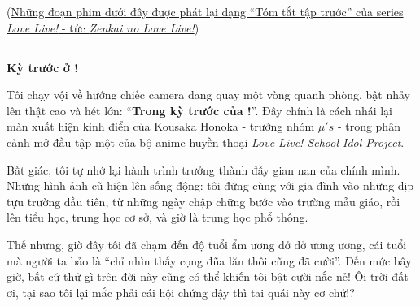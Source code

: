 \documentclass[../main.tex]{subfiles}
\begin{document}

\begin{center}
  (\uline{Những đoạn phim dưới đây được phát lại dạng ``Tóm tắt tập trước'' của series \textit{Love Live!} - tức \textit{Zenkai no Love Live!}})
\end{center}

\subsection*{\label{ep-003.I}}

\begin{center}
  \textbf{Kỳ trước ở \hll !}
\end{center}



Tôi chạy vội về hướng chiếc camera đang quay một vòng quanh phòng, bật nhảy lên thật cao và hét lớn: ``\textbf{Trong kỳ trước của \hll!}''. Đây chính là cách nhái lại màn xuất hiện kinh điển của Kousaka Honoka - trưởng nhóm $\mu's$ - trong phân cảnh mở đầu tập một của bộ anime huyền thoại \textit{Love Live! School Idol Project}.

Bất giác, tôi tự nhớ lại hành trình trưởng thành đầy gian nan của chính mình. Những hình ảnh cũ hiện lên sống động: tôi đứng cùng với gia đình vào những dịp tựu trường đầu tiên, từ những ngày chập chững bước vào trường mẫu giáo, rồi lên tiểu học, trung học cơ sở, và giờ là trung học phổ thông.

Thế nhưng, giờ đây tôi đã chạm đến độ tuổi ẩm ương dở dở ương ương, cái tuổi mà người ta bảo là ``chỉ nhìn thấy cọng đũa lăn thôi cũng đã cười''. Đến mức bây giờ, bất cứ thứ gì trên đời này cũng có thể khiến tôi bật cười nắc nẻ! Ôi trời đất ơi, tại sao tôi lại mắc phải cái hội chứng dậy thì tai quái này cơ chứ!?

\end{document}
